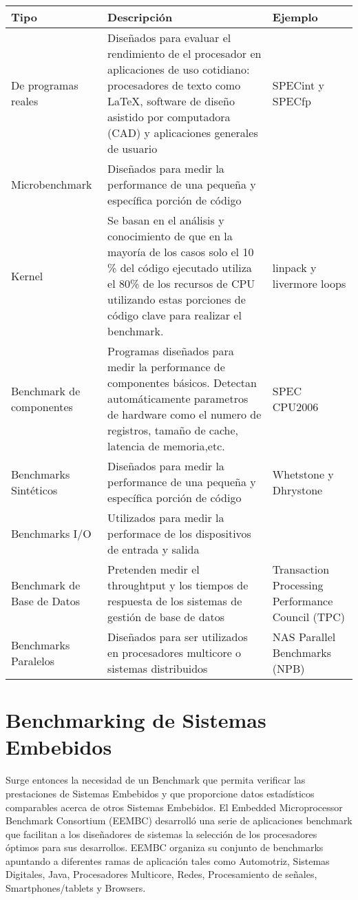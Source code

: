		\begin{tabular}{ p{2.5cm} p{8cm} p{3cm} }
		\hline 
		\rowcolor[gray]{0.8} Tipo & Descripción & Ejemplo \\
		\hline
		De programas reales  &  Diseñados para evaluar el rendimiento de el procesador en aplicaciones de uso cotidiano: procesadores de texto
		como \LaTeX, software de diseño asistido por computadora (CAD) y aplicaciones generales de usuario & SPECint y SPECfp\\
		\hline
		Microbenchmark  &  Diseñados para medir la performance de una pequeña y específica porción de código \\
		\hline
		Kernel			&  Se basan en el análisis y conocimiento de que en la mayoría de los casos solo el 10 \% del código ejecutado utiliza el 80\% de los
		recursos de CPU utilizando estas porciones de código clave para realizar el benchmark.\cite{EtiquetaBM01} & linpack y livermore loops\\
		\hline
		Benchmark de componentes & Programas diseñados para medir la performance de componentes básicos. Detectan automáticamente parametros de hardware
		como el numero de registros, tamaño de cache, latencia de memoria,etc. &  SPEC CPU2006\\
		\hline
		Benchmarks Sintéticos  &  Diseñados para medir la performance de una pequeña y específica porción de código & Whetstone y Dhrystone\\
		\hline
		Benchmarks I/O  &  Utilizados para medir la performace de los dispositivos de entrada y salida & \\
		\hline
		Benchmark de Base de Datos  & Pretenden medir el throughtput y los tiempos de respuesta de los sistemas de gestión de base de datos & Transaction
		Processing Performance Council (TPC)\\
		\hline
		Benchmarks Paralelos  &  Diseñados para ser utilizados en procesadores multicore o sistemas distribuidos & NAS Parallel Benchmarks (NPB)\\
		\hline
		\end{tabular}
	
	\section{Benchmarking de Sistemas Embebidos}
 	
	Surge entonces la necesidad de un Benchmark que permita verificar las prestaciones de Sistemas Embebidos y que proporcione datos estadísticos
	comparables acerca de otros Sistemas Embebidos. El Embedded Microprocessor Benchmark Consortium (EEMBC) desarrolló una serie de aplicaciones
	benchmark que facilitan a los diseñadores de sistemas la selección de los procesadores óptimos para sus desarrollos. EEMBC organiza su conjunto de
	benchmarks apuntando a diferentes ramas de aplicación tales como Automotriz, Sistemas Digitales, Java, Procesadores Multicore, Redes, Procesamiento
	de señales, Smartphones/tablets y Browsers.
	
